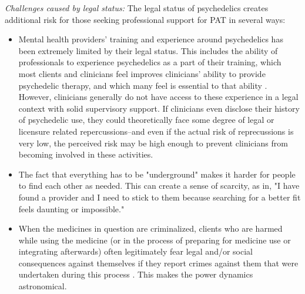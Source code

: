 \documentclass[12pt,letterpaper]{book}
\begin{document}
\textit{Challenges caused by legal status:} The legal status of psychedelics creates additional risk for those seeking professional support for PAT in several ways:
\begin{itemize}
    \item Mental health providers' training and experience around psychedelics has been extremely limited by their legal status. This includes the ability of professionals to experience psychedelics as a part of their training, which most clients and clinicians feel improves clinicians' ability to provide psychedelic therapy, and which many feel is essential to that ability \cite{liknaitzkyProfessionalExperience}. However, clinicians generally do not have access to these experience in a legal context with solid supervisory support. If clinicians even disclose their history of psychedelic use, they could theoretically face some degree of legal or licensure related repercussions--and even if the actual risk of reprecussions is very low, the perceived risk may be high enough to prevent clinicians from becoming involved in these activities.
    \item The fact that everything has to be "underground" makes it harder for people to find each other as needed.  This can create a sense of scarcity, as in, "I have found a provider and I need to stick to them because searching for a better fit feels daunting or impossible."
    \item When the medicines in question are criminalized, clients who are harmed while using the medicine (or in the process of preparing for medicine use or integrating afterwards) often legitimately fear legal and/or social consequences against themselves if they report crimes against them that were undertaken during this process \cite{powerTrip}. This makes the power dynamics astronomical.
\end{itemize}
\end{document}
